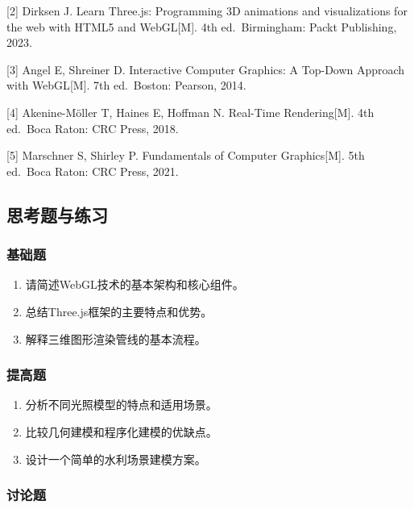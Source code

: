 {[}2{]} Dirksen J. Learn Three.js: Programming 3D animations and visualizations for the web with HTML5 and WebGL{[}M{]}. 4th ed.~Birmingham: Packt Publishing, 2023.

{[}3{]} Angel E, Shreiner D. Interactive Computer Graphics: A Top-Down Approach with WebGL{[}M{]}. 7th ed.~Boston: Pearson, 2014.

{[}4{]} Akenine-Möller T, Haines E, Hoffman N. Real-Time Rendering{[}M{]}. 4th ed.~Boca Raton: CRC Press, 2018.

{[}5{]} Marschner S, Shirley P. Fundamentals of Computer Graphics{[}M{]}. 5th ed.~Boca Raton: CRC Press, 2021.

\subsection{思考题与练习}\label{ux601dux8003ux9898ux4e0eux7ec3ux4e60}

\subsubsection{基础题}\label{ux57faux7840ux9898}

\begin{enumerate}
\def\labelenumi{\arabic{enumi}.}
\tightlist
\item
  请简述WebGL技术的基本架构和核心组件。
\item
  总结Three.js框架的主要特点和优势。
\item
  解释三维图形渲染管线的基本流程。
\end{enumerate}

\subsubsection{提高题}\label{ux63d0ux9ad8ux9898}

\begin{enumerate}
\def\labelenumi{\arabic{enumi}.}
\setcounter{enumi}{3}
\tightlist
\item
  分析不同光照模型的特点和适用场景。
\item
  比较几何建模和程序化建模的优缺点。
\item
  设计一个简单的水利场景建模方案。
\end{enumerate}

\subsubsection{讨论题}\label{ux8ba8ux8bbaux9898}

